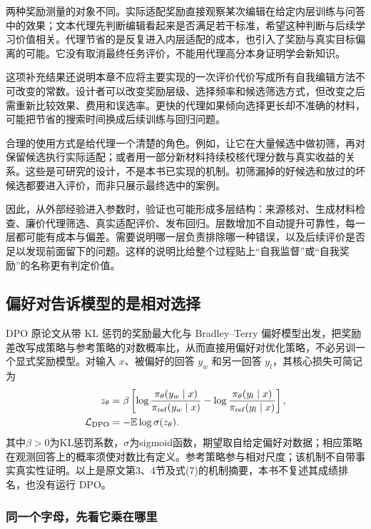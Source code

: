 两种奖励测量的对象不同。实际适配奖励直接观察某次编辑在给定内层训练与问答中的效果；文本代理先判断编辑看起来是否满足若干标准，希望这种判断与后续学习价值相关。代理节省的是反复进入内层适配的成本，也引入了奖励与真实目标偏离的可能。它没有取消最终任务评价，不能用代理高分本身证明学会新知识。

这项补充结果还说明本章不应将主要实现的一次评价代价写成所有自我编辑方法不可改变的常数。设计者可以改变奖励层级、选择频率和候选筛选方式，但改变之后需重新比较效果、费用和误选率。更快的代理如果倾向选择更长却不准确的材料，可能把节省的搜索时间换成后续训练与回归问题。

合理的使用方式是给代理一个清楚的角色。例如，让它在大量候选中做初筛，再对保留候选执行实际适配；或者用一部分新材料持续校核代理分数与真实收益的关系。这些是可研究的设计，不是本书已实现的机制。初筛漏掉的好候选和放过的坏候选都要进入评价，而非只展示最终选中的案例。

因此，从外部经验进入参数时，验证也可能形成多层结构：来源核对、生成材料检查、廉价代理筛选、真实适配评价、发布回归。层数增加不自动提升可靠性，每一层都可能有成本与偏差。需要说明哪一层负责排除哪一种错误，以及后续评价是否足以发现前面留下的问题。这样的说明比给整个过程贴上“自我监督”或“自我奖励”的名称更有判定价值。


\subsection{偏好对告诉模型的是相对选择}
\label{sec:ch10-preferencepair}

DPO 原论文从带 KL 惩罚的奖励最大化与 Bradley--Terry 偏好模型出发，把奖励差改写成策略与参考策略的对数概率比，从而直接用偏好对优化策略，不必另训一个显式奖励模型\cite{dpo-2305}。对输入 $x$、被偏好的回答 $y_w$ 和另一回答 $y_l$，其核心损失可简记为
\begin{align}
 z_\theta&=\beta\left[\log\frac{\pi_\theta(y_w\mid x)}{\pi_{\rm ref}(y_w\mid x)}-\log\frac{\pi_\theta(y_l\mid x)}{\pi_{\rm ref}(y_l\mid x)}\right],\\
 \mathcal L_{\rm DPO}&=-\mathbb E\log\sigma(z_\theta).
\end{align}
其中$\beta>0$为KL惩罚系数，$\sigma$为sigmoid函数，期望取自给定偏好对数据；相应策略在观测回答上的概率须使对数比有定义。参考策略参与相对尺度；该机制不自带事实真实性证明。以上是原文第3、4节及式(7)的机制摘要，本书不复述其成绩排名，也没有运行 DPO。


\subsubsection{同一个字母，先看它乘在哪里}

